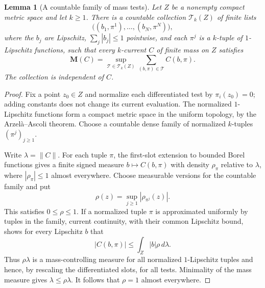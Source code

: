 \documentclass[11pt]{article}
\numberwithin{equation}{section}
\newtheorem{lemma}[theorem]{Lemma}
\theoremstyle{definition}
\theoremstyle{remark}
\begin{document}
\begin{lemma}[A countable family of mass tests]
\label{lem:countable-mass-tests}
Let $Z$ be a nonempty compact metric space and let $k\ge1$.  There is a
countable collection $\mathcal T_k(Z)$ of finite lists
\[
 \bigl((b_1,\pi^1),\ldots,(b_N,\pi^N)\bigr),
\]
where the $b_j$ are Lipschitz, $\sum_j|b_j|\le1$ pointwise, and each
$\pi^j$ is a $k$-tuple of $1$-Lipschitz functions, such that every
$k$-current $C$ of finite mass on $Z$ satisfies
\begin{equation}
 \mathbf M(C)=\sup_{\mathcal T\in\mathcal T_k(Z)}
                  \sum_{(b,\pi)\in\mathcal T}C(b,\pi).
 \label{eq:countable-mass-tests}
\end{equation}
The collection is independent of $C$.
\end{lemma}

\begin{proof}
Fix a point $z_0\in Z$ and normalize each differentiated test by
$\pi_i(z_0)=0$; adding constants does not change its current evaluation.
The normalized $1$-Lipschitz functions form a compact metric space in
the uniform topology, by the Arzel\`a--Ascoli theorem.  Choose a
countable dense family of normalized $k$-tuples
$(\pi^j)_{j\ge1}$.

Write $\lambda=\|C\|$.  For each tuple $\pi$, the first-slot extension
to bounded Borel functions gives a finite signed measure
$b\mapsto C(b,\pi)$ with density $\rho_\pi$ relative to $\lambda$,
where $|\rho_\pi|\le1$ almost everywhere.  Choose measurable versions
for the countable family and put
\[
 \rho(z)=\sup_{j\ge1}|\rho_{\pi^j}(z)|.
\]
This satisfies $0\le\rho\le1$.  If a normalized tuple $\pi$ is
approximated uniformly by tuples in the family, current continuity,
with their common Lipschitz bound, shows for every Lipschitz $b$ that
\[
 |C(b,\pi)|\le\int_Z|b|\rho\,d\lambda.
\]
Thus $\rho\lambda$ is a mass-controlling measure for all normalized
$1$-Lipschitz tuples and hence, by rescaling the differentiated slots,
for all tests.  Minimality of the mass measure gives
$\lambda\le\rho\lambda$.  It follows that $\rho=1$ almost everywhere.


\end{proof}
\end{document}
